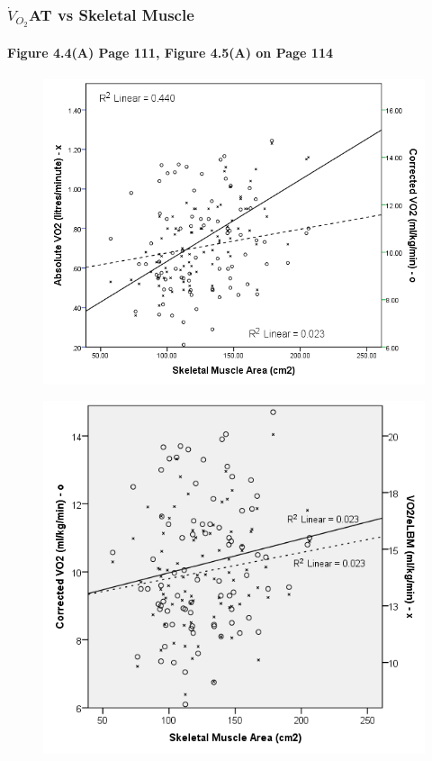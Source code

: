 \documentclass{beamer}
\begin{document}
\begin{frame}
	\frametitle{$\dot{V}_{O_2}$AT vs Skeletal Muscle}
	\framesubtitle{Figure 4.4(A) Page 111, Figure 4.5(A) on Page 114}


	\begin{figure}
		\includegraphics[height=0.4\textheight]{../Figures/bc_scatter_VO2_skeletal}
	\end{figure}

	\begin{figure}
		\includegraphics[height=0.45\textheight]{../Figures/bc_scatter_VO2_skeletal_elbm}
	\end{figure}
	
\end{frame}
\end{document}
